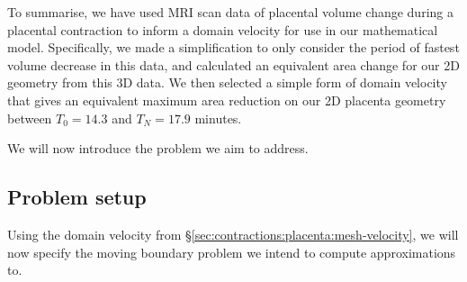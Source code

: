             To summarise, we have used MRI scan data of placental volume change during a placental contraction to inform a domain velocity for use in our mathematical model. Specifically, we made a simplification to only consider the period of fastest volume decrease in this data, and calculated an equivalent area change for our 2D geometry from this 3D data. We then selected a simple form of domain velocity that gives an equivalent maximum area reduction on our 2D placenta geometry between $T_0 = 14.3$ and $T_N = 17.9$ minutes.

            We will now introduce the problem we aim to address.

        \subsection{Problem setup} \label{sec:contractions:placenta:problem-setup}
            Using the domain velocity from \S\ref{sec:contractions:placenta:mesh-velocity}, we will now specify the moving boundary problem we intend to compute approximations to.
            
